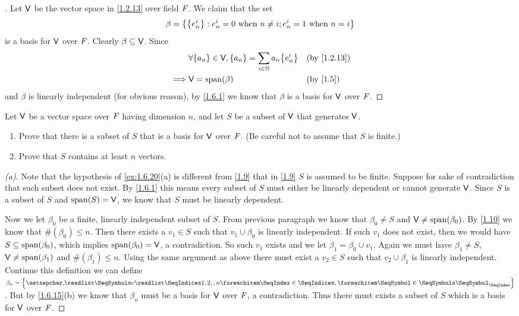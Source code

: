 \begin{proof}[]
  Let \(\mathsf{V}\) be the vector space in \cref{1.2.13} over field \(\mathit{F}\).
  We claim that the set
  \[
    \beta = \left\lbrace\left\lbrace e_n^i\right\rbrace : e_n^i = 0 \text{ when } n \neq i ; e_n^i = 1 \text{ when } n = i\right\rbrace
  \]
  is a basis for \(\mathsf{V}\) over \(\mathit{F}\).
  Clearly \(\beta \subseteq \mathsf{V}\).
  Since
  \begin{align*}
             & \forall \set{a_n} \in \V, \set{a_n} = \sum_{i \in \N} a_n \set{e_n^i} &  & \text{(by \cref{1.2.13})} \\
    \implies & \V = \spn{\beta}                                                      &  & \text{(by \cref{1.5})}
  \end{align*}
  and \(\beta\) is linearly independent (for obvious reason), by \cref{1.6.1} we know that \(\beta\) is a basis for \(\mathsf{V}\) over \(\mathit{F}\).
\end{proof}

\setcounter{ex}{19}
\begin{ex}\label{ex:1.6.20}
  Let \(\mathsf{V}\) be a vector space over \(\mathit{F}\) having dimension \(n\), and let \(S\) be a subset of \(\mathsf{V}\) that generates \(\mathsf{V}\).
  \begin{enumerate}
    \item Prove that there is a subset of \(S\) that is a basis for \(\mathsf{V}\) over \(\mathit{F}\).
          (Be careful not to assume that \(S\) is finite.)
    \item Prove that \(S\) contains at least \(n\) vectors.
  \end{enumerate}
\end{ex}

\begin{proof}[(a)]
  Note that the hypothesis of \cref{ex:1.6.20}(a) is different from \cref{1.9} that in \cref{1.9} \(S\) is assumed to be finite.
  Suppose for sake of contradiction that such subset does not exist.
  By \cref{1.6.1} this means every subset of \(S\) must either be linearly dependent or cannot generate \(\mathsf{V}\).
  Since \(S\) is a subset of \(S\) and \(\spn{S} = \V\), we know that \(S\) must be linearly dependent.

  Now we let \(\beta_0\) be a finite, linearly independent subset of \(S\).
  From previous paragraph we know that \(\beta_0 \neq S\) and \(\V \neq \spn{\beta_0}\).
  By \cref{1.10} we know that \(\#(\beta_0) \leq n\).
  Then there exists a \(v_1 \in S\) such that \(v_1 \cup \beta_0\) is linearly independent.
  If such \(v_1\) does not exist, then we would have \(S \subseteq \spn{\beta_0}\), which implies \(\spn{\beta_0} = \V\), a contradiction.
  So such \(v_1\) exists and we let \(\beta_1 = \beta_0 \cup v_1\).
  Again we must have \(\beta_1 \neq S\), \(\V \neq \spn{\beta_1}\) and \(\#(\beta_1) \leq n\).
  Using the same argument as above there must exist a \(v_2 \in S\) such that \(v_2 \cup \beta_1\) is linearly independent.
  Continue this definition we can define \(\beta_n = \set{\seq{v}{1,2,,n}}\).
  But by \cref{1.6.15}(b) we know that \(\beta_n\) must be a basis for \(\mathsf{V}\) over \(\mathit{F}\), a contradiction.
  Thus there must exists a subset of \(S\) which is a basis for \(\mathsf{V}\) over \(\mathit{F}\).
\end{proof}

